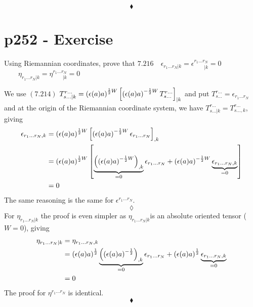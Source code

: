 $$\blacklozenge$$
\newpage

\section{p252 - Exercise }
\begin{tcolorbox}
Using Riemannian coordinates, prove that 
$\mathbf{7.216}\quad \epsilon_{r_1\dots r_N|k}=\epsilon^{r_1\dots r_N}_{\quad\quad |k}=0$
$\quad \quad \eta_{r_1\dots r_N|k}= \eta^{r_1\dots r_N}_{\quad\quad|k}=0$
\end{tcolorbox}
We use $\mathbf{(7.214)}$   $T^{r\dots}_{s\dots |k}= \left(\epsilon(a)a\right)^{\frac{1}{2} W}\left[ \left(\epsilon(a)a\right)^{-\frac{1}{2} W} T^{r\dots}_{s\dots }\right]_{|k}$ and put $T^{r\dots}_{s\dots }=\epsilon_{r_1 \dots r_N}$ and at the origin of the Riemannian coordinate system, we have $T^{r\dots}_{s\dots |k}=T^{r\dots}_{s\dots,k}$, giving
\begin{align*}
\epsilon_{r_1 \dots r_N,k} &= \left(\epsilon(a)a\right)^{\frac{1}{2} W}\left[ \left(\epsilon(a)a\right)^{-\frac{1}{2} W} \epsilon_{r_1 \dots r_N}\right]_{,k}\\
&= \left(\epsilon(a)a\right)^{\frac{1}{2} W}\left[ \underbrace{\left(\left(\epsilon(a)a\right)^{-\frac{1}{2} W}\right)_{,k}}_{=0} \epsilon_{r_1 \dots r_N}+\left(\epsilon(a)a\right)^{-\frac{1}{2} W} \underbrace{\epsilon_{r_1 \dots r_N,k}}_{=0}\right]\\
&=0
\end{align*}
The same reasoning is the same for $\epsilon^{r_1\dots r_N}$.
$$\lozenge$$
For $ \eta_{r_1\dots r_N|k}$ the proof is even simpler as $ \eta_{r_1\dots r_N|k}$is an absolute oriented tensor ($W=0$), giving 
\begin{align*}
\eta_{r_1 \dots r_N|k} &= \eta_{r_1 \dots r_N,k}\\
&= \left(\epsilon(a)a\right)^{\frac{1}{2} } \underbrace{\left(\left(\epsilon(a)a\right)^{-\frac{1}{2} }\right)_{,k}}_{=0} \epsilon_{r_1 \dots r_N}+\left(\epsilon(a)a\right)^{\frac{1}{2} } \underbrace{\epsilon_{r_1 \dots r_N,k}}_{=0}\\
&=0
\end{align*}
The proof for $\eta^{r_1\dots r_N}$ is identical.
$$\blacklozenge$$
\newpage




